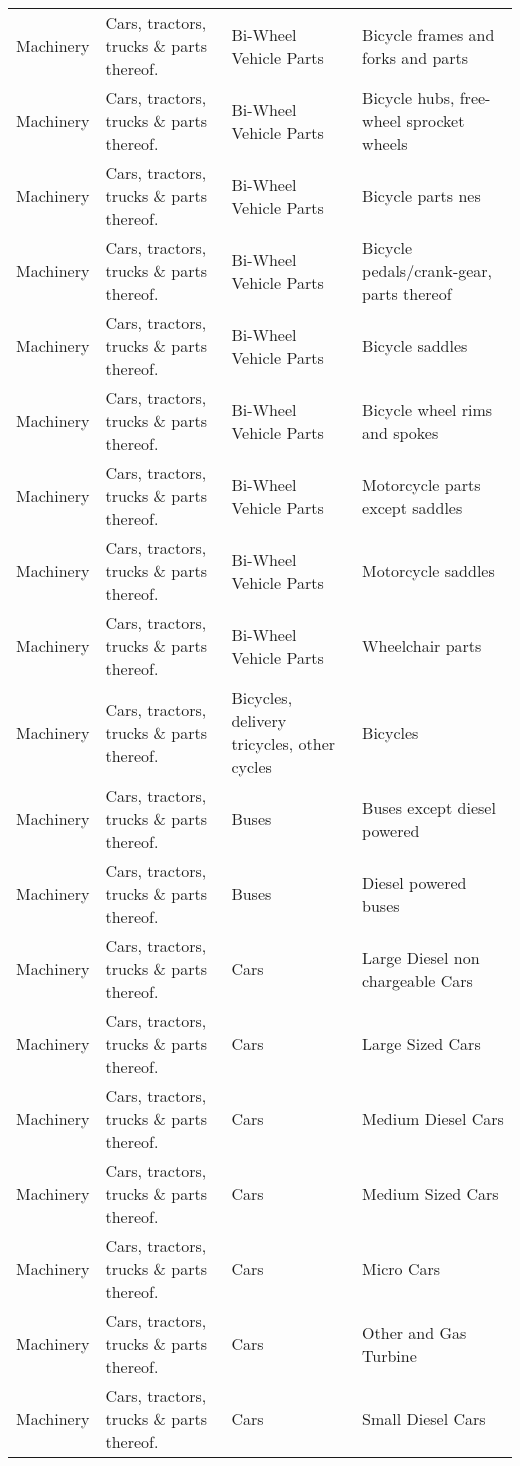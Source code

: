 \begin{appendices}
\begin{xltabular}{\textwidth}{|p{0.07\textwidth}|p{0.25\textwidth}|p{0.28\textwidth}|p{0.3\textwidth}|}
		Machinery & Cars, tractors, trucks \& parts thereof. & Bi-Wheel Vehicle Parts & Bicycle frames and forks and parts \\
		Machinery & Cars, tractors, trucks \& parts thereof. & Bi-Wheel Vehicle Parts & Bicycle hubs, free-wheel sprocket wheels \\
		Machinery & Cars, tractors, trucks \& parts thereof. & Bi-Wheel Vehicle Parts & Bicycle parts nes \\
		Machinery & Cars, tractors, trucks \& parts thereof. & Bi-Wheel Vehicle Parts & Bicycle pedals/crank-gear, parts thereof \\
		Machinery & Cars, tractors, trucks \& parts thereof. & Bi-Wheel Vehicle Parts & Bicycle saddles \\
		Machinery & Cars, tractors, trucks \& parts thereof. & Bi-Wheel Vehicle Parts & Bicycle wheel rims and spokes \\
		Machinery & Cars, tractors, trucks \& parts thereof. & Bi-Wheel Vehicle Parts & Motorcycle parts except saddles \\
		Machinery & Cars, tractors, trucks \& parts thereof. & Bi-Wheel Vehicle Parts & Motorcycle saddles \\
		Machinery & Cars, tractors, trucks \& parts thereof. & Bi-Wheel Vehicle Parts & Wheelchair parts \\
		Machinery & Cars, tractors, trucks \& parts thereof. & Bicycles, delivery tricycles, other cycles & Bicycles \\
		Machinery & Cars, tractors, trucks \& parts thereof. & Buses & Buses except diesel powered \\
		Machinery & Cars, tractors, trucks \& parts thereof. & Buses & Diesel powered buses \\
		Machinery & Cars, tractors, trucks \& parts thereof. & Cars & Large Diesel non chargeable Cars \\
		Machinery & Cars, tractors, trucks \& parts thereof. & Cars & Large Sized Cars \\
		Machinery & Cars, tractors, trucks \& parts thereof. & Cars & Medium Diesel Cars \\
		Machinery & Cars, tractors, trucks \& parts thereof. & Cars & Medium Sized Cars \\
		Machinery & Cars, tractors, trucks \& parts thereof. & Cars & Micro Cars \\
		Machinery & Cars, tractors, trucks \& parts thereof. & Cars & Other and Gas Turbine  \\
		Machinery & Cars, tractors, trucks \& parts thereof. & Cars & Small Diesel Cars \\

\end{xltabular}
\end{appendices}
